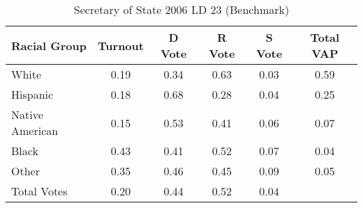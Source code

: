 \begin{table}[htb]
\begin{center}
\caption{Secretary of State 2006 LD 23 (Benchmark)}
\label{sos06_vap_ld_23_benchmark}
\begin{tabular}{lccccc}
  \hline
Racial Group & Turnout & D Vote & R Vote & S Vote & Total VAP \\ 
  \hline
White & 0.19 & 0.34 & 0.63 & 0.03 & 0.59 \\ 
  Hispanic & 0.18 & 0.68 & 0.28 & 0.04 & 0.25 \\ 
  Native American & 0.15 & 0.53 & 0.41 & 0.06 & 0.07 \\ 
  Black & 0.43 & 0.41 & 0.52 & 0.07 & 0.04 \\ 
  Other & 0.35 & 0.46 & 0.45 & 0.09 & 0.05 \\ 
  Total Votes & 0.20 & 0.44 & 0.52 & 0.04 &  \\ 
   \hline
\end{tabular}
\end{center}
\end{table}
